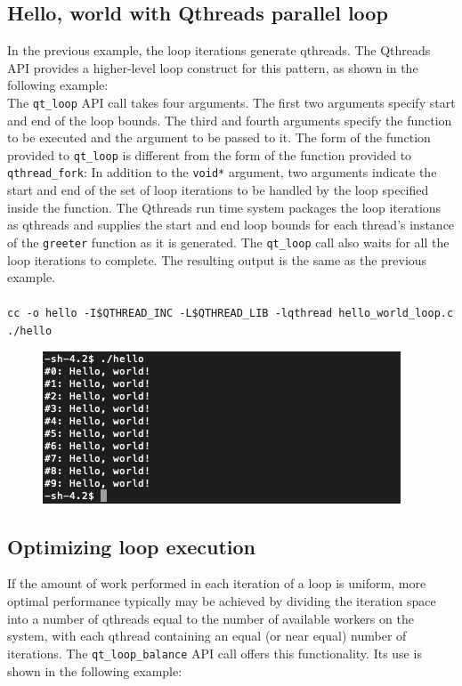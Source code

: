 \documentclass[12pt,fullpage]{article}
\begin{document}
\subsection{Hello, world with Qthreads parallel loop}

In the previous example, the loop iterations generate qthreads.  The Qthreads API provides a higher-level loop construct for this pattern, as shown in the following example:
\\


The {\tt qt\_loop} API call takes four arguments.  The first two arguments specify start and end of the loop bounds.  The third and fourth arguments specify the function to be executed and the argument to be passed to it.  The form of the function provided to {\tt qt\_loop} is different from the form of the function provided to {\tt qthread\_fork}:  In addition to the {\tt void*} argument, two arguments indicate the start and end of the set of loop iterations to be handled by the loop specified inside the function.  The Qthreads run time system packages the loop iterations as qthreads and supplies the start and end loop bounds for each thread's instance of the {\tt greeter} function as it is generated.  The {\tt qt\_loop} call also waits for all the loop iterations to complete.  The resulting output is the same as the previous example.
\\ \\
{\footnotesize{\tt cc -o hello -I\$QTHREAD\_INC -L\$QTHREAD\_LIB -lqthread hello\_world\_loop.c}}
\\
{\footnotesize{\tt ./hello}}
\begin{figure}[h]
\includegraphics[scale=0.84]{hello_world_loop.png}
\end{figure}

\subsection{Optimizing loop execution}

If the amount of work performed in each iteration of a loop is uniform, more optimal performance typically may be achieved by dividing the iteration space into a number of qthreads equal to the number of available workers on the system, with each qthread containing an equal (or near equal) number of iterations.  The {\tt qt\_loop\_balance} API call offers this functionality.  Its use is shown in the following example:
\\

\end{document}
